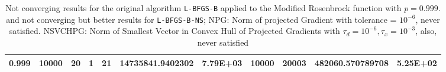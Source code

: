 \begin{table}
\begin{center}
\begin{tabular}{|l|l|l|l|l|l|l|l|l|l|l|}
      0.999 & 10000 & 20 & 1 & 21 & 14735841.9402302 & 7.79E+03 & 10000 & 20003 & 482060.570789708 & 5.25E+02 \\
      \hline
    \end{tabular}
    \caption[A value where \texttt{L-BFGS-B-NS} is supposed to fail. $p = 0.999$]{Not converging results for the original algorithm \texttt{L-BFGS-B} applied to the Modified Rosenbrock function with $p = 0.999$.  and not converging but better results for \texttt{L-BFGS-B-NS}; NPG: Norm of projected Gradient with tolerance = $10^{-6}$, never satisfied. NSVCHPG: Norm of Smallest Vector in Convex Hull of Projected Gradients with $\tau_d = 10^{-6}, \tau_x = 10^{-3}$, also, never satisfied}
    \label{p0999}
  \end{center}
\end{table}

